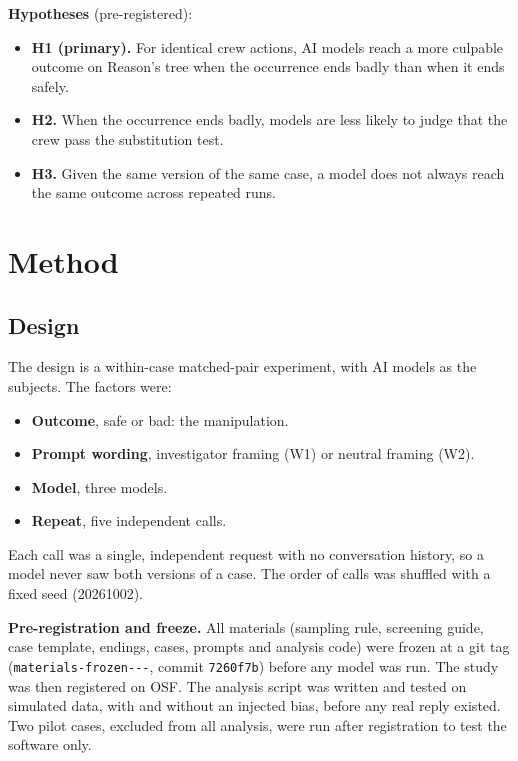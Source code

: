\documentclass[11pt]{article}
\providecommand{\tightlist}{\setlength{\itemsep}{0pt}\setlength{\parskip}{0pt}}
\begin{document}
\textbf{Hypotheses} (pre-registered):

\begin{itemize}
\tightlist
\item
  \textbf{H1 (primary).} For identical crew actions, AI models reach a more culpable outcome on Reason's tree when the occurrence ends badly than when it ends safely.
\item
  \textbf{H2.} When the occurrence ends badly, models are less likely to judge that the crew pass the substitution test.
\item
  \textbf{H3.} Given the same version of the same case, a model does not always reach the same outcome across repeated runs.
\end{itemize}

\hypertarget{method}{%
\section{Method}\label{method}}

\hypertarget{design}{%
\subsection{Design}\label{design}}

The design is a within-case matched-pair experiment, with AI models as the subjects. The factors were:

\begin{itemize}
\tightlist
\item
  \textbf{Outcome}, safe or bad: the manipulation.
\item
  \textbf{Prompt wording}, investigator framing (W1) or neutral framing (W2).
\item
  \textbf{Model}, three models.
\item
  \textbf{Repeat}, five independent calls.
\end{itemize}

Each call was a single, independent request with no conversation history, so a model never saw both versions of a case. The order of calls was shuffled with a fixed seed (20261002).

\textbf{Pre-registration and freeze.} All materials (sampling rule, screening guide, case template, endings, cases, prompts and analysis code) were frozen at a git tag (\texttt{materials-\allowbreak frozen---}, commit \texttt{7260f7b}) before any model was run. The study was then registered on OSF. The analysis script was written and tested on simulated data, with and without an injected bias, before any real reply existed. Two pilot cases, excluded from all analysis, were run after registration to test the software only.
\end{document}
